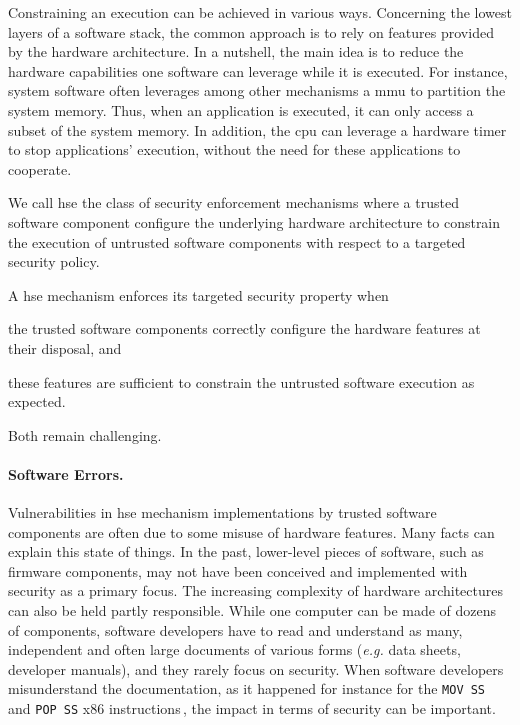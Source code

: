 Constraining an execution can be achieved in various ways.
%
Concerning the lowest layers of a software stack, the common approach is to rely
on features provided by the hardware architecture.
%
In a nutshell, the main idea is to reduce the hardware capabilities one software
can leverage while it is executed.
%
For instance, system software often leverages among other mechanisms a \ac{mmu}
to partition the system memory.
%
Thus, when an application is executed, it can only access a subset of the system
memory.
%
In addition, the \ac{cpu} can leverage a hardware timer to stop applications'
execution, without the need for these applications to cooperate.

\begin{definition}
  We call \ac{hse} the class of security enforcement mechanisms where a trusted
  software component configure the underlying hardware architecture to constrain
  the execution of untrusted software components with respect to a targeted
  security policy.
\end{definition}

A \ac{hse} mechanism enforces its targeted security property when
%
\begin{inparaenum}[(1)]
\item the trusted software components correctly configure the hardware features
  at their disposal, and
%
\item these features are sufficient to constrain the untrusted software
  execution as expected.
\end{inparaenum}
%
Both remain challenging.

\paragraph{Software Errors.}
%
Vulnerabilities in \ac{hse} mechanism implementations by trusted software
components are often due to some misuse of hardware features.
%
Many facts can explain this state of things.
%
In the past, lower-level pieces of software, such as firmware components, may
not have been conceived and implemented with security as a primary focus.
%
The increasing complexity of hardware architectures can also be held partly
responsible.
%
While one computer can be made of dozens of components, software developers have
to read and understand as many, independent and often large documents of various
forms (\emph{e.g.} data sheets, developer manuals), and they rarely focus on
security.
%
When software developers misunderstand the documentation, as it happened for
instance for the \texttt{MOV SS} and \texttt{POP SS} x86
instructions\,\cite{movsspopss}, the impact in terms of security can be
important.

